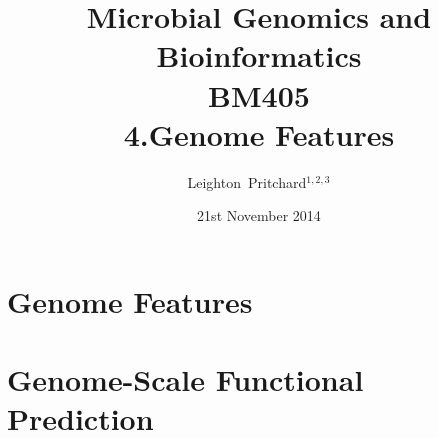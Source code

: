 

%



\title[Microbial Genomics and Bioinformatics: 4.Genome Features] %
{Microbial Genomics and \\ Bioinformatics \\
BM405 \\
4.Genome Features}
\author[Pritchard] %
{Leighton~Pritchard$^{1,2,3}$}
\date[21st November 2014] %
{21st November 2014}
\subject{Bioinformatics, Genomics, Bacteria, Sequencing, Microbiology, Microbes}





\frame[plain]{\titlepage}



\section{Genome Features}





\section{Genome-Scale Functional Prediction}
%

